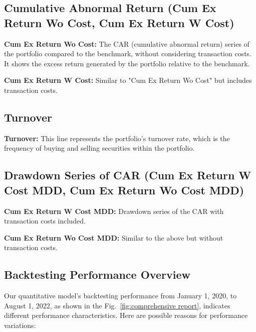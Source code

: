 \documentclass[conference]{IEEEtran}
\begin{document}
\subsection*{\textbf{Cumulative Abnormal Return (Cum Ex Return Wo Cost, Cum Ex Return W Cost)}}

\textbf{Cum Ex Return Wo Cost:}
The CAR (cumulative abnormal return) series of the portfolio compared to the benchmark, without considering transaction costs. It shows the excess return generated by the portfolio relative to the benchmark.

\textbf{Cum Ex Return W Cost:}
Similar to "Cum Ex Return Wo Cost" but includes transaction costs.

\subsection*{Turnover}
\textbf{Turnover:}
This line represents the portfolio's turnover rate, which is the frequency of buying and selling securities within the portfolio.

\subsection*{\textbf{Drawdown Series of CAR (Cum Ex Return W Cost MDD, Cum Ex Return Wo Cost MDD)}}
\textbf{Cum Ex Return W Cost MDD:}
Drawdown series of the CAR with transaction costs included.

\textbf{Cum Ex Return Wo Cost MDD:}
Similar to the above but without transaction costs.

\begin{center}
\subsection*{\textbf{Backtesting Performance Overview}}
\end{center}

Our quantitative model's backtesting performance from January 1, 2020, to August 1, 2022, as shown in the Fig.~\ref{fig:comprehensive report}, indicates different performance characteristics. Here are possible reasons for performance variations:
\end{document}
